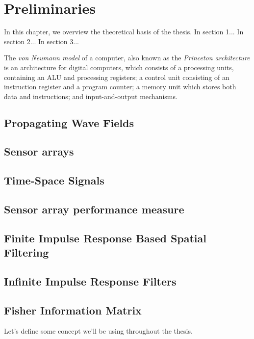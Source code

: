 \chapter{Preliminaries}
\label{chap:prelims}

In this chapter, we overview the theoretical basis of the thesis. 
In section 1...
In section 2...
In section 3...

\begin{definition}
The \emph{von Neumann model} of a computer, also known as the \emph{Princeton architecture} is an architecture for digital computers, which consists of a processing units, containing an ALU and processing registers; a control unit consisting of an instruction register and a program counter; a memory unit which stores both data and instructions; and input-and-output mechanisms.
\end{definition}

\section{Propagating Wave Fields}
\label{sec:prlm_propWaveField}

\section{Sensor arrays}
\label{sec:prlm_sensorArrays}

\section{Time-Space Signals}
\label{sec:prlm_timeSpaceSig}

\section{Sensor array performance measure}
\label{sec:prlm_sensorArrayPerf}

\section{Finite Impulse Response Based Spatial Filtering}
\label{sec:prlm_FIR}

\section{Infinite Impulse Response Filters}
\label{sec:prlm_IIR}
\section{Fisher Information Matrix}
\label{sec:prlm_FIM}

Let's define some concept we'll be using throughout the thesis.



